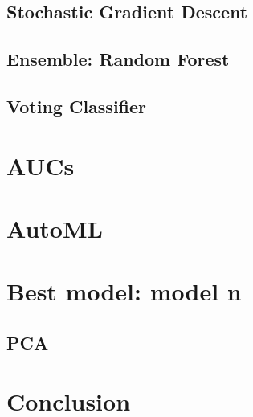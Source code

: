 \documentclass[titlepage, 11pt]{article}
\begin{document}
\subsection{Stochastic Gradient Descent}


\subsection{Ensemble: Random Forest}


\subsection{Voting Classifier}


\section{AUCs}

\section{AutoML}


\section{Best model: model n}
\subsection{PCA}

\section{Conclusion}

\end{document}
